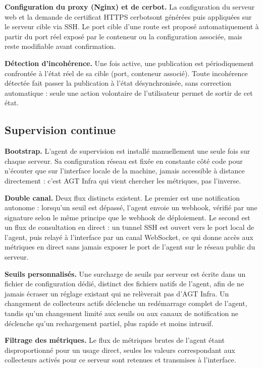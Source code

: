 \textbf{Configuration du proxy (Nginx) et de cerbot.} La configuration du serveur web et la
demande de certificat HTTPS cerbotsont générées puis appliquées sur le
serveur cible via SSH. Le port cible d'une route est proposé
automatiquement à partir du port réel exposé par le conteneur ou la
configuration associée, mais reste modifiable avant confirmation.

\textbf{Détection d'incohérence.} Une fois active, une publication est
périodiquement confrontée à l'état réel de sa cible (port, conteneur
associé). Toute incohérence détectée fait passer la publication à
l'état désynchronisée, sans correction automatique : seule une action
volontaire de l'utilisateur permet de sortir de cet état.


\subsection{Supervision continue}

\textbf{Bootstrap.} L'agent de supervision est installé manuellement
une seule fois sur chaque serveur. Sa configuration réseau est fixée en
constante côté code pour n'écouter que sur l'interface locale de la
machine, jamais accessible à distance directement : c'est AGT Infra qui
vient chercher les métriques, pas l'inverse.

\textbf{Double canal.} Deux flux distincts existent. Le premier est une
notification autonome : lorsqu'un seuil est dépassé, l'agent envoie un
webhook, vérifié par une signature selon le même principe que le
webhook de déploiement. Le second est un flux de consultation en
direct : un tunnel SSH est ouvert vers le port local de l'agent, puis
relayé à l'interface par un canal WebSocket, ce qui donne accès aux
métriques en direct sans jamais exposer le port de l'agent sur le
réseau public du serveur.

\textbf{Seuils personnalisés.} Une surcharge de seuils par serveur est
écrite dans un fichier de configuration dédié, distinct des fichiers
natifs de l'agent, afin de ne jamais écraser un réglage existant qui ne
relèverait pas d'AGT Infra. Un changement de collecteurs actifs déclenche
un redémarrage complet de l'agent, tandis qu'un changement limité aux
seuils ou aux canaux de notification ne déclenche qu'un rechargement
partiel, plus rapide et moins intrusif.

\textbf{Filtrage des métriques.} Le flux de métriques brutes de l'agent
étant disproportionné pour un usage direct, seules les valeurs
correspondant aux collecteurs activés pour ce serveur sont retenues et
transmises à l'interface.

